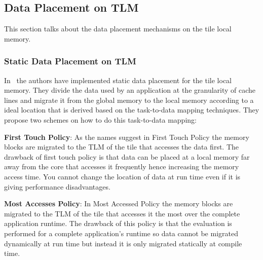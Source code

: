 \documentclass{listhesis}
\begin{document}
\subsection{Data Placement on TLM}
This section talks about the data placement mechanisms on the tile local memory.
\subsubsection{Static Data Placement on TLM}
In~\cite{lispaper} the authors have implemented static data placement for the tile local memory. They divide the data used by an application at the granularity of cache lines and migrate it from the global memory to the local memory according to a ideal location that is derived based on the task-to-data mapping techniques. They propose two schemes on how to do this task-to-data mapping:\\
\par
\textbf{First Touch Policy}: As the names suggest in First Touch Policy the memory blocks are migrated to the TLM of the tile that accesses the data first. The drawback of first touch policy is that data can be placed at a local memory far away from the core that accesses it frequently hence increasing the memory access time. You cannot change the location of data at run time even if it is giving performance disadvantages.\\  
\par
\textbf{Most Accesses Policy}: In Most Accessed Policy the memory blocks are migrated to the TLM of the tile that accesses it the most over the complete application runtime. The drawback of this policy is that the evaluation is performed for a complete application's runtime so data cannot be migrated dynamically at run time but instead it is only migrated statically at compile time.
\end{document}

